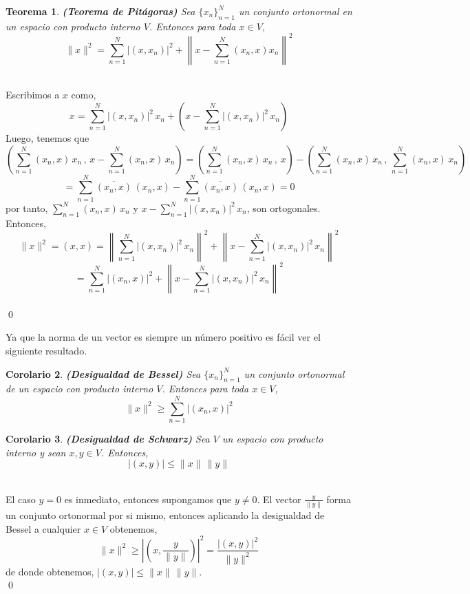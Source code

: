 \documentclass[12pt]{book}
\numberwithin{equation}{chapter}
\newtheorem{theorem}{Teorema}[chapter]
\newtheorem{corollary}[theorem]{Corolario}
\def\n{\noindent}
\begin{document}
\begin{theorem}
{\bf (Teorema de Pit\'agoras)}  Sea $\{x_{n}\}_{n=1}^{N}$ un conjunto ortonormal en un espacio con producto interno $V$. Entonces para toda $x \in V$,
$$ \|x\|^{2}= \sum_{n=1}^{N} |(x,x_{n})|^{2} + \left\| x - \sum_{n=1}^{N} (x_{n},x)x_{n} \right\|^{2} $$
\end{theorem} 
\n {\bf Demostraci\'on}\\
Escribimos a $x$ como,
$$ x= \sum_{n=1}^{N} |(x,x_{n})|^{2}\, x_{n} + \left( x - \sum_{n=1}^{N} |(x,x_{n})|^{2}\, x_{n} \right) $$
Luego, tenemos que
$$ \left(\sum_{n=1}^{N} (x_{n},x)\,x_{n}\, , \, x - \sum_{n=1}^{N}(x_{n},x)\,x_{n}  \right)= \left( \sum_{n=1}^{N} (x_{n},x)\,x_{n}\, , \, x \right) - \left( \sum_{n=1}^{N} (x_{n},x)\,x_{n}\, , \, \sum_{n=1}^{N} (x_{n},x)\,x_{n} \right) $$
$$ = \sum_{n=1}^{N} \overline{(x_{n},x)}\, (x_{n},x) - \sum_{n=1}^{N} \overline{(x_{n},x)}\, (x_{n},x)=0 $$
por tanto, $\sum_{n=1}^{N} (x_{n},x)\,x_{n}$ y $ x - \sum_{n=1}^{N} |(x,x_{n})|^{2}\, x_{n} $, son ortogonales.\\
Entonces,
$$ \|x\|^{2}= (x,x)= \left\| \sum_{n=1}^{N} |(x,x_{n})|^{2}\, x_{n} \right\|^{2} + \left\| x - \sum_{n=1}^{N} |(x,x_{n})|^{2}\, x_{n} \right\|^{2} $$
$$ = \sum_{n=1}^{N} |(x_{n},x)|^{2} + \left\| x - \sum_{n=1}^{N} |(x,x_{n})|^{2}\, x_{n} \right\|^{2} $$
\\ \qed

\vspace{5 mm}

\n Ya que la norma de un vector es siempre un n\'umero positivo es f\'acil ver el siguiente resultado.

\begin{corollary}
{\bf (Desigualdad de Bessel)} Sea $\{x_{n}\}_{n=1}^{N}$ un conjunto ortonormal de un espacio con producto interno $V$. Entonces para toda $x \in V$,
$$ \| x \|^{2} \geq \sum_{n=1}^{N} |(x_{n},x)|^{2} $$ 
\end{corollary}

\begin{corollary}
{\bf (Desigualdad de Schwarz)} Sea $V$ un espacio con producto interno y sean $x,y \in V$. Entonces,
$$ |(x,y)| \leq \|x\| \, \|y\| $$ 
\end{corollary}
\n {\bf Demostraci\'on}\\
El caso $y=0$ es inmediato, entonces supongamos que $y \neq 0$. El vector $ \frac{y}{\|y\|} $ forma un conjunto ortonormal por si mismo, entonces aplicando la desigualdad de Bessel a cualquier $x \in V$ obtenemos,
$$ \|x\|^{2} \geq  \left| \left( x , \frac{y}{\|y\|} \right) \right|^{2}= \frac{|(x,y)|^{2}}{\|y\|^{2}} $$
de donde obtenemos, $ |(x,y)| \leq \|x\| \, \|y\| $.\\ \qed
\end{document}
